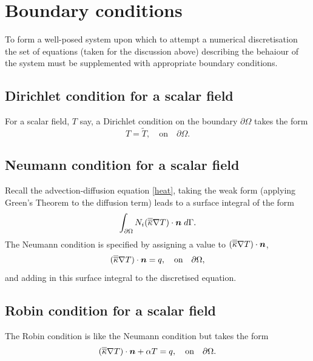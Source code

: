 \section{Boundary conditions}\label{Sect:BCs}
To form a well-posed system upon which to attempt a numerical discretisation the
set of equations (taken for the discussion above) describing the behaiour of the 
system must be supplemented with appropriate boundary conditions.


\subsection{Dirichlet condition for a scalar field}\label{sect:bc_scalar_dirichlet}
For a scalar field, $T$ say, a Dirichlet condition on the boundary
$\partial\Omega$ takes the form
\begin{equation*}
T=\tilde{T},\quad \textrm{on}\quad \partial\Omega.
\end{equation*}


\subsection{Neumann condition for a scalar field}\label{sect:bc_scalar_neumann}
Recall the advection-diffusion equation \eqref{heat}, taking the weak form (applying Green's
Theorem to the diffusion term) leads to a surface integral of the form
\begin{equation*}
\int_{\partial\Omega} N_i (\overline{\overline{\kappa}}\nabla T)\cdot{\mbox{\boldmath$n$}} \;d\Gamma.
\end{equation*}
The Neumann condition is specified by assigning a value to $(\overline{\overline{\kappa}}\nabla T)\cdot{\mbox{\boldmath$n$}}$, \eg
\begin{equation*}
(\overline{\overline{\kappa}}\nabla T)\cdot{\mbox{\boldmath$n$}} = q,\quad \textrm{on}\quad \partial\Omega,
\end{equation*}
and adding in this surface integral to the discretised equation.


\subsection{Robin condition for a scalar field}\label{sect:bc_scalar_robin}
The Robin condition is like the Neumann condition but takes the form
\begin{equation*}
(\overline{\overline{\kappa}}\nabla T)\cdot{\mbox{\boldmath$n$}} + \alpha T = q,\quad \textrm{on}\quad \partial\Omega.
\end{equation*}


